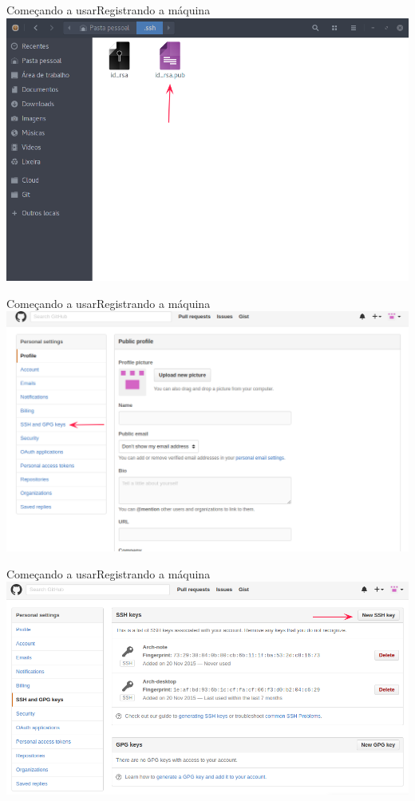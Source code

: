 \documentclass[10pt]{beamer}
\begin{document}
\begin{frame}{Começando a usar}{Registrando a máquina}
  \includegraphics[scale=0.42]{AAUgraphics/ssh4}
\end{frame}
\begin{frame}{Começando a usar}{Registrando a máquina}
  \includegraphics[scale=0.37]{AAUgraphics/ssh5}
\end{frame}
\begin{frame}{Começando a usar}{Registrando a máquina}
  \includegraphics[scale=0.37]{AAUgraphics/ssh6}
\end{frame}
\end{document}
